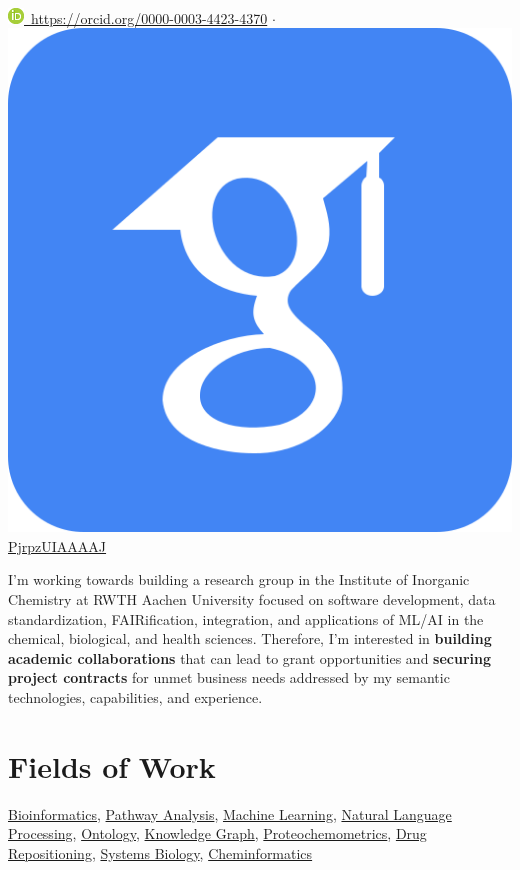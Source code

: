\documentclass[10pt,a4paper,sans]{moderncv} %
\newcommand{\wikidata}[2]{\href{https://bioregistry.io/wikidata:#1?provider=scholia}{{#2}}}
\begin{document}
\\
\href{https://orcid.org/0000-0003-4423-4370}{\includegraphics[scale=0.5]{img/ORCIDiD_icon16x16}\ https://orcid.org/0000-0003-4423-4370}
$\cdot$
\href{https://scholar.google.com/citations?user=PjrpzUIAAAAJ}{\includegraphics[scale=0.015625]{img/google_scholar_icon_130918} PjrpzUIAAAAJ}

\vspace{3mm}

I'm working towards building a research group in the Institute of Inorganic Chemistry at RWTH Aachen University focused on software development, data standardization, FAIRification, integration, and
applications of ML/AI in the chemical, biological, and health sciences.
Therefore, I'm interested in \textbf{building academic collaborations} that can lead to grant opportunities and \textbf{securing project contracts} for unmet business needs addressed by my semantic technologies, capabilities, and experience.

\section{Fields of Work}\label{sec:fields}

    \wikidata{Q128570}{Bioinformatics},     \wikidata{Q25303877}{Pathway Analysis},     \wikidata{Q2539}{Machine Learning},     \wikidata{Q30642}{Natural Language Processing},     \wikidata{Q324254}{Ontology},     \wikidata{Q33002955}{Knowledge Graph},     \wikidata{Q50327360}{Proteochemometrics},     \wikidata{Q5308921}{Drug Repositioning},     \wikidata{Q815297}{Systems Biology},     \wikidata{Q910164}{Cheminformatics}
\end{document}
